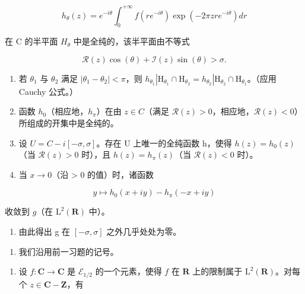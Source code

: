 \[
h _ {\theta} (z) = e ^ {- i \theta} \int_ {0} ^ {+ \infty} f (r e ^ {- i \theta}) \exp (- 2 \pi z r e ^ {- i \theta}) d r
\]

在 C 的半平面 \(H_{\theta}\) 中是全纯的，该半平面由不等式

\[
\mathcal {R} (z) \cos (\theta) + \mathcal {I} (z) \sin (\theta) > \sigma .
\]

\begin{enumerate}
\def\labelenumi{\alph{enumi})}
\setcounter{enumi}{2}
\item
  若 \(\theta_{1}\) 与 \(\theta_{2}\) 满足 \(|\theta_{1} - \theta_{2}| < \pi\)，则 \(h_{\theta_1}|\mathrm{H}_{\theta_1} \cap \mathrm{H}_{\theta_2} = h_{\theta_2}|\mathrm{H}_{\theta_2} \cap \mathrm{H}_{\theta_1}\)。（应用 Cauchy 公式。）
\item
  函数 \(h_{0}\)（相应地，\(h_{\pi}\)）在由 \(z \in C\)（满足 \(\mathcal{R}(z) > 0\)，相应地，\(\mathcal{R}(z) < 0\)）所组成的开集中是全纯的。
\item
  设 \(U = C - i[-\sigma, \sigma]\)。存在 U 上唯一的全纯函数 h，使得 \(h(z) = h_{0}(z)\)（当 \(\mathcal{R}(z) > 0\) 时），且 \(h(z) = h_{\pi}(z)\)（当 \(\mathcal{R}(z) < 0\) 时）。
\item
  当 \(x \rightarrow 0\)（沿 \textgreater{} 0 的值）时，诸函数
\end{enumerate}

\[
y \mapsto h _ {0} (x + i y) - h _ {\pi} (- x + i y)
\]

收敛到 \(g\)（在 \(\mathrm{L}^2 (\mathbf{R})\) 中）。

\begin{enumerate}
\def\labelenumi{\alph{enumi})}
\setcounter{enumi}{6}
\tightlist
\item
  由此得出 g 在 \([-\sigma, \sigma]\) 之外几乎处处为零。
\end{enumerate}

\begin{enumerate}
\def\labelenumi{\arabic{enumi})}
\setcounter{enumi}{36}
\tightlist
\item
  我们沿用前一习题的记号。
\end{enumerate}

\begin{enumerate}
\def\labelenumi{\alph{enumi})}
\tightlist
\item
  设 \(f\colon\mathbf{C}\to\mathbf{C}\) 是 \(\mathcal{E}_{1/2}\) 的一个元素，使得 \(f\) 在 \(\mathbf{R}\) 上的限制属于 \(\mathrm{L}^{2}(\mathbf{R})\)。对每个 \(z\in\mathbf{C}-\mathbf{Z}\)，有
\end{enumerate}

